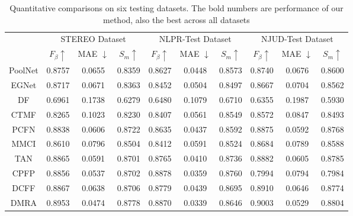 \documentclass[runningheads]{llncs}
\begin{document}
\begin{table*}[t]
	\renewcommand\arraystretch{0.85}
	\caption{Quantitative comparisons on six testing datasets. The bold numbers are performance of our method, also the best across all datasets}
	\begin{center}
\begin{tabular}{|c|c|c|c||c|c|c||c|c|c|}
			\hline
			\multirow{2}{*}{} & \multicolumn{3}{c||}{STEREO Dataset} & \multicolumn{3}{c||}{NLPR-Test Dataset} & \multicolumn{3}{c|}{NJUD-Test Dataset} \\[0.5ex]
			\cline{2-10}
			\cline{2-10}
			& $F_{\beta}\uparrow$ & MAE $\downarrow$ & $S_m \uparrow$ & $F_{\beta}\uparrow$ & MAE $\downarrow$ & $S_m \uparrow$ & $F_{\beta}\uparrow$ & MAE $\downarrow$ & $S_m \uparrow$  \\
			\hline\hline
			
			PoolNet \cite{PoolNet} & 0.8757 & 0.0655 & 0.8359 & 0.8627 & 0.0448 & 0.8573 & 0.8740 & 0.0676 & 0.8600  \\
			
			EGNet \cite{EGNet} & 0.8717 & 0.0671 & 0.8363 & 0.8452 & 0.0504 & 0.8497 & 0.8667 & 0.0704 & 0.8562 \\
			
			DF \cite{DF}  & 0.6961 & 0.1738 & 0.6279 & 0.6480 & 0.1079 & 0.6710 & 0.6355 & 0.1987 & 0.5930  \\
			
			CTMF \cite{CTMF}  & 0.8265 & 0.1023 & 0.8230 & 0.8407 & 0.0561 & 0.8549 & 0.8572 & 0.0847 & 0.8493  \\
			
			PCFN \cite{PCFN}  & 0.8838 & 0.0606 & 0.8722 & 0.8635 & 0.0437 & 0.8592 & 0.8875 & 0.0592 & 0.8768  \\
			
			MMCI \cite{MMCI}  & 0.8610 & 0.0796 & 0.8504 & 0.8412 & 0.0591 & 0.8524 & 0.8684 & 0.0789 & 0.8588  \\
			
			TAN \cite{TAN} & 0.8865 & 0.0591 & 0.8701 & 0.8765 & 0.0410 & 0.8736 & 0.8882 & 0.0605 & 0.8785  \\
			
			CPFP \cite{CPFP}  & 0.8856 & 0.0537 & 0.8702 & 0.8878 & 0.0359 & 0.8760 & 0.7994 & 0.0794 & 0.7984  \\
			
			DCFF \cite{DCFF} & 0.8867 & 0.0638 & 0.8706 & 0.8779 & 0.0439 & 0.8695 & 0.8910 & 0.0646 & 0.8774  \\
			
			DMRA \cite{DMRA} & 0.8953 & 0.0474 & 0.8778 & 0.8870 & 0.0339 & 0.8646 & 0.9003 & 0.0529 & 0.8804  \\
			

\end{tabular}
\end{center}
\end{table*}
\end{document}
